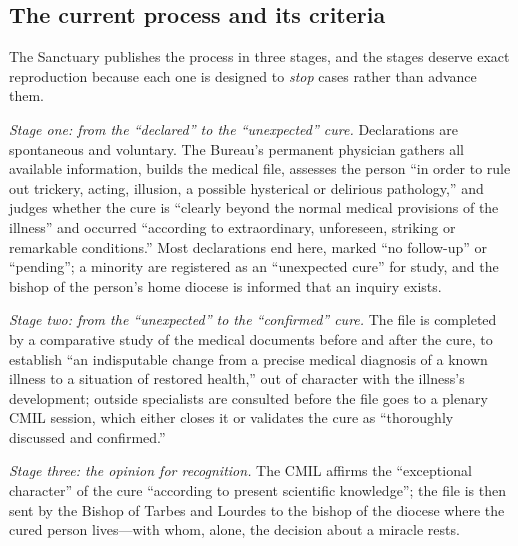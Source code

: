 \subsection{The current process and its criteria}

The Sanctuary publishes the process in three stages, and the
stages deserve exact reproduction because each one is designed to
\emph{stop} cases rather than advance them.

\emph{Stage one: from the ``declared'' to the ``unexpected''
cure.} Declarations are spontaneous and voluntary. The Bureau's
permanent physician gathers all available information, builds the
medical file, assesses the person ``in order to rule out
trickery, acting, illusion, a possible hysterical or delirious
pathology,'' and judges whether the cure is ``clearly beyond the
normal medical provisions of the illness'' and occurred ``according
to extraordinary, unforeseen, striking or remarkable conditions.''
Most declarations end here, marked ``no follow-up'' or
``pending''; a minority are registered as an ``unexpected cure''
for study, and the bishop of the person's home diocese is
informed that an inquiry exists.

\emph{Stage two: from the ``unexpected'' to the ``confirmed''
cure.} The file is completed by a comparative study of the medical
documents before and after the cure, to establish ``an
indisputable change from a precise medical diagnosis of a known
illness to a situation of restored health,'' out of character with
the illness's development; outside specialists are consulted
before the file goes to a plenary CMIL session, which either
closes it or validates the cure as ``thoroughly discussed and
confirmed.''

\emph{Stage three: the opinion for recognition.} The CMIL affirms
the ``exceptional character'' of the cure ``according to present
scientific knowledge''; the file is then sent by the Bishop of
Tarbes and Lourdes to the bishop of the diocese where the cured
person lives---with whom, alone, the decision about a miracle
rests.

